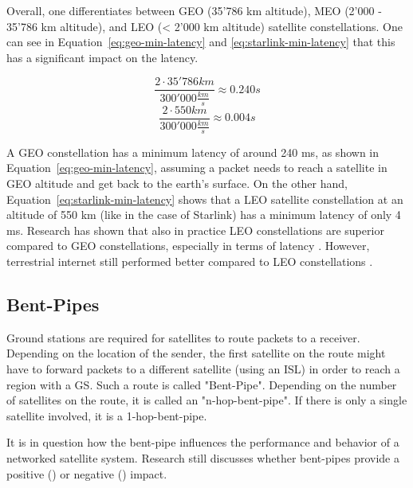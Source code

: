 Overall, one differentiates between \ac{GEO} (35'786 km altitude), \ac{MEO}
(2'000 - 35'786 km altitude), and \ac{LEO} (< 2'000 km altitude) satellite
constellations. One can see in Equation~\ref{eq:geo-min-latency} and
\ref{eq:starlink-min-latency} that this has a significant impact on the
latency.

\begin{equation}
	\frac{2 \cdot 35'786 km}{300'000 \frac{km}{s}} \approx 0.240 s
	\label{eq:geo-min-latency}
\end{equation}
\begin{equation}
	\frac{2 \cdot 550 km}{300'000 \frac{km}{s}} \approx 0.004 s
	\label{eq:starlink-min-latency}
\end{equation}

A \ac{GEO} constellation has a minimum latency of around 240 ms, as shown in
Equation~\ref{eq:geo-min-latency}, assuming a packet needs to reach a satellite
in GEO altitude and get back to the earth's surface. On the other hand,
Equation~\ref{eq:starlink-min-latency} shows that a \ac{LEO} satellite
constellation at an altitude of 550 km (like in the case of Starlink) has a
minimum latency of only 4 ms. Research has shown that also in practice \ac{LEO}
constellations are superior compared to \ac{GEO} constellations, especially in
terms of latency \cite{DBLP:journals/pacmnet/RamanVCSZ23, Segan2020}. However,
terrestrial internet still performed better compared to \ac{LEO} constellations
\cite{DBLP:conf/www/MohanFCBRMO24, DBLP:conf/infocom/MaCZCML23}.

\subsection{Bent-Pipes} \label{sec:bent-pipes}

Ground stations are required for satellites to route packets to a receiver.
Depending on the location of the sender, the first satellite on the route might
have to forward packets to a different satellite (using an \ac{ISL}) in order
to reach a region with a \ac{GS}. Such a route is called "Bent-Pipe". Depending
on the number of satellites on the route, it is called an "n-hop-bent-pipe". If
there is only a single satellite involved, it is a 1-hop-bent-pipe.

It is in question how the bent-pipe influences the performance and behavior of
a networked satellite system. Research still discusses whether bent-pipes
provide a positive (\cite{DBLP:conf/hotnets/HauriBGS20}) or negative
(\cite{DBLP:conf/www/MohanFCBRMO24}) impact.

